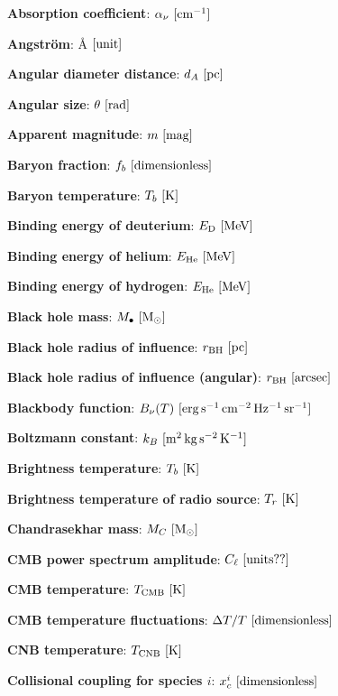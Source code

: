 \documentclass[a4paper,11pt]{article}
\begin{document}
{\noindent}\textbf{Absorption coefficient}: $\alpha_\nu ~ [{\rm cm^{-1}}]$

{\noindent}\textbf{Angstr\"{o}m}: \AA$ ~ [{\rm unit}]$

{\noindent}\textbf{Angular diameter distance}: $d_A ~ [{\rm pc}]$

{\noindent}\textbf{Angular size}: $\theta ~ [{\rm rad}]$

{\noindent}\textbf{Apparent magnitude}: $m ~ [{\rm mag}]$

{\noindent}\textbf{Baryon fraction}: $f_b ~ [{\rm dimensionless}]$

{\noindent}\textbf{Baryon temperature}: $T_b ~ [{\rm K}]$

{\noindent}\textbf{Binding energy of deuterium}: $E_\mathrm{D} ~ [{\rm MeV}]$

{\noindent}\textbf{Binding energy of helium}: $E_\mathrm{He} ~ [{\rm MeV}]$

{\noindent}\textbf{Binding energy of hydrogen}: $E_\mathrm{He} ~ [{\rm MeV}]$

{\noindent}\textbf{Black hole mass}: $M_\bullet ~ [{\rm M_\odot}]$

{\noindent}\textbf{Black hole radius of influence}: $r_\mathrm{BH} ~ [{\rm pc}]$

{\noindent}\textbf{Black hole radius of influence (angular)}: $r_\mathrm{BH} ~ [{\rm arcsec}]$

{\noindent}\textbf{Blackbody function}: $B_\nu(T) ~ [{\rm erg\,s^{-1}\,cm^{-2}\,Hz^{-1}\,sr^{-1}}]$

{\noindent}\textbf{Boltzmann constant}: $k_B ~ [{\rm m^2\,kg\,s^{-2}\,K^{-1}}]$

{\noindent}\textbf{Brightness temperature}: $T_b ~ [{\rm K}]$

{\noindent}\textbf{Brightness temperature of radio source}: $T_r ~ [{\rm K}]$

{\noindent}\textbf{Chandrasekhar mass}: $M_C ~ [{\rm M_\odot}]$

{\noindent}\textbf{CMB power spectrum amplitude}: $C_\ell ~ [{\rm units??}]$

{\noindent}\textbf{CMB temperature}: $T_\mathrm{CMB} ~ [{\rm K}]$

{\noindent}\textbf{CMB temperature fluctuations}: $\Delta T/T ~ [{\rm dimensionless}]$

{\noindent}\textbf{CNB temperature}: $T_\mathrm{CNB} ~ [{\rm K}]$

{\noindent}\textbf{Collisional coupling for species $i$}: $x_c^i ~ [{\rm
dimensionless}]$
\end{document}
